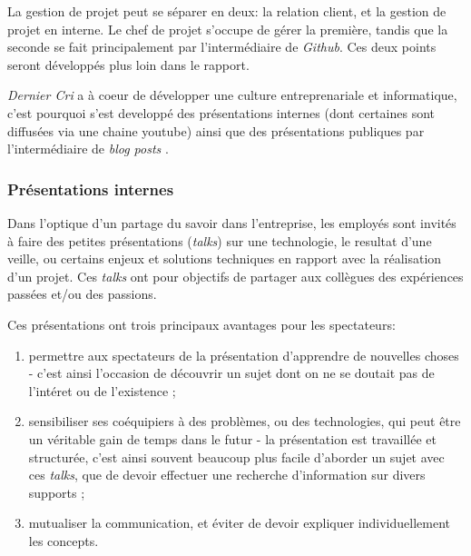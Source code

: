 \bigskip

La gestion de projet peut se séparer en deux: la relation client, et la
gestion de projet en interne. Le chef de projet s'occupe de gérer la
première, tandis que la seconde se fait principalement par
l'intermédiaire de \emph{Github}. Ces deux points seront développés plus
loin dans le rapport.

\bigskip

\emph{Dernier Cri} a à coeur de développer une culture entreprenariale
et informatique, c'est pourquoi s'est developpé des présentations
internes (dont certaines sont diffusées via une chaine youtube) ainsi
que des présentations publiques par l'intermédiaire de \emph{blog posts}
.

\subsubsection{Présentations internes}\label{pruxe9sentations-internes}

\bigskip

Dans l'optique d'un partage du savoir dans l'entreprise, les employés
sont invités à faire des petites présentations (\emph{talks}) sur une
technologie, le resultat d'une veille, ou certains enjeux et solutions
techniques en rapport avec la réalisation d'un projet. Ces \emph{talks}
ont pour objectifs de partager aux collègues des expériences passées
et/ou des passions.

\bigskip

Ces présentations ont trois principaux avantages pour les spectateurs:

\begin{enumerate}
\def\labelenumi{\arabic{enumi}.}
\tightlist
\item
  permettre aux spectateurs de la présentation d'apprendre de nouvelles
  choses - c'est ainsi l'occasion de découvrir un sujet dont on ne se
  doutait pas de l'intéret ou de l'existence ;\\
\item
  sensibiliser ses coéquipiers à des problèmes, ou des technologies, qui
  peut être un véritable gain de temps dans le futur - la présentation
  est travaillée et structurée, c'est ainsi souvent beaucoup plus facile
  d'aborder un sujet avec ces \emph{talks}, que de devoir effectuer une
  recherche d'information sur divers supports ;\\
\item
  mutualiser la communication, et éviter de devoir expliquer
  individuellement les concepts.
\end{enumerate}

